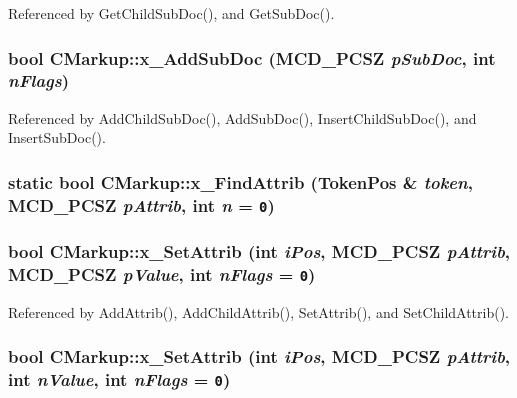 Referenced by GetChildSubDoc(), and GetSubDoc().
\subsubsection[x\_\-AddSubDoc]{\setlength{\rightskip}{0pt plus 5cm}bool CMarkup::x\_\-AddSubDoc (MCD\_\-PCSZ {\em pSubDoc}, \/  int {\em nFlags})\hspace{0.3cm}{\tt  [protected]}}\label{classCMarkup_9b842e3673c7ee3da3eaeaa1dfb8c204}




Referenced by AddChildSubDoc(), AddSubDoc(), InsertChildSubDoc(), and InsertSubDoc().
\subsubsection[x\_\-FindAttrib]{\setlength{\rightskip}{0pt plus 5cm}static bool CMarkup::x\_\-FindAttrib ({\bf TokenPos} \& {\em token}, \/  MCD\_\-PCSZ {\em pAttrib}, \/  int {\em n} = {\tt 0})\hspace{0.3cm}{\tt  [static, protected]}}\label{classCMarkup_dcd241445e2bca6e1f05fa28babbc5a1}


\subsubsection[x\_\-SetAttrib]{\setlength{\rightskip}{0pt plus 5cm}bool CMarkup::x\_\-SetAttrib (int {\em iPos}, \/  MCD\_\-PCSZ {\em pAttrib}, \/  MCD\_\-PCSZ {\em pValue}, \/  int {\em nFlags} = {\tt 0})\hspace{0.3cm}{\tt  [protected]}}\label{classCMarkup_5716401661aa51b04936c9f7df163ba7}




Referenced by AddAttrib(), AddChildAttrib(), SetAttrib(), and SetChildAttrib().
\subsubsection[x\_\-SetAttrib]{\setlength{\rightskip}{0pt plus 5cm}bool CMarkup::x\_\-SetAttrib (int {\em iPos}, \/  MCD\_\-PCSZ {\em pAttrib}, \/  int {\em nValue}, \/  int {\em nFlags} = {\tt 0})\hspace{0.3cm}{\tt  [protected]}}\label{classCMarkup_8fdf35d7e47bf09bdeef322cc2eef57e}


